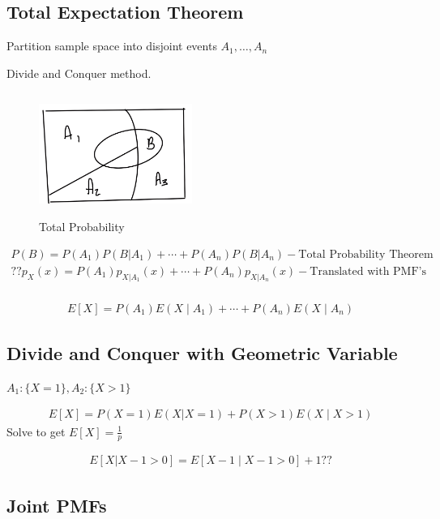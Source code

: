 \documentclass{article}
\begin{document}
\subsection{Total Expectation Theorem}


Partition sample space into disjoint events $A_1, \ldots, A_n$

Divide and Conquer method.

\begin{figure}[h]
\centering
\includegraphics[width=5cm, height=4cm]{images/L02/total_prob.jpeg}
\caption{Total Probability}
\end{figure}

\begin{align*}
P(B)=P(A_1)P(B|A_1) + \cdots + P(A_n)P(B|A_n) - \text{Total Probability Theorem} \\
?? p_X(x) = P(A_1)p_{X|A_1}(x) + \cdots + P(A_n)p_{X|A_n}(x) - \text{Translated with PMF's}\\
\end{align*}

\begin{align*}
E[X]=P(A_1)E(X \mid A_1) + \cdots + P(A_n)E(X \mid A_n)
\end{align*}

\subsection{Divide and Conquer with Geometric Variable}


$A_1:\{X=1\}, A_2:\{X >1\}$

\begin{align*}
E[X]=P(X=1)E(X|X=1) + P(X > 1)E(X \mid X>1)
\end{align*}
Solve to get $E[X]=\frac{1}{p}$

\begin{align*}
E[X|X-1 >0] = E[X-1 \mid X-1>0] + 1 ??
\end{align*}

\subsection{Joint PMFs}
\end{document}

